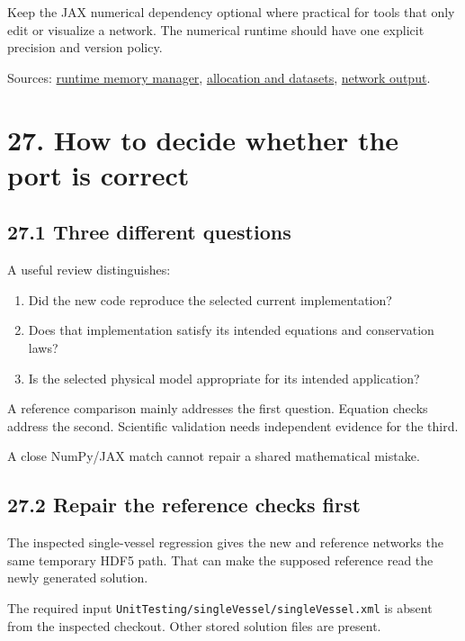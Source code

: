 \documentclass[11pt,a4paper]{article}
\begin{document}
Keep the JAX numerical dependency optional where practical for tools that only edit or visualize a network. The numerical runtime should have one explicit precision and version policy.

Sources: \href{/home/sadid/starfish/UtilityLib/classRuntimeMemoryManager.py}{runtime memory manager}, \href{/home/sadid/starfish/UtilityLib/classStarfishBaseObject.py}{allocation and datasets}, \href{/home/sadid/starfish/NetworkLib/classVascularNetwork.py}{network output}.

\clearpage
\section{27. How to decide whether the port is correct}
\subsection{27.1 Three different questions}
A useful review distinguishes:


\begin{enumerate}
\item Did the new code reproduce the selected current implementation?


\item Does that implementation satisfy its intended equations and conservation laws?


\item Is the selected physical model appropriate for its intended application?


\end{enumerate}
A reference comparison mainly addresses the first question. Equation checks address the second. Scientific validation needs independent evidence for the third.

A close NumPy/JAX match cannot repair a shared mathematical mistake.

\subsection{27.2 Repair the reference checks first}
The inspected single-vessel regression gives the new and reference networks the same temporary HDF5 path. That can make the supposed reference read the newly generated solution.

The required input \texttt{UnitTesting/\allowbreak{}singleVessel/\allowbreak{}singleVessel.\allowbreak{}xml} is absent from the inspected checkout. Other stored solution files are present.
\end{document}
